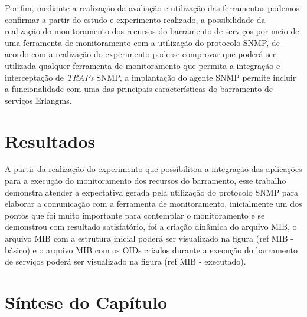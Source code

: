 Por fim, mediante a realização da avaliação e utilização das ferramentas podemos confirmar a partir do estudo e experimento realizado, a possibilidade da realização do monitoramento dos recursos do barramento de serviços por meio de uma ferramenta de monitoramento com a utilização do protocolo \acrshort{SNMP}, de acordo com a realização do experimento pode-se comprovar que poderá ser utilizada qualquer ferramenta de monitoramento que permita a integração e interceptação de \textit{TRAPs} \acrshort{SNMP}, a implantação do agente \acrshort{SNMP} permite incluir a funcionalidade com uma das principais características do barramento de serviços Erlangms.   



\section{Resultados}
\label{resultados}

A partir da realização do experimento que possibilitou a integração das aplicações para a execução do monitoramento dos recursos do barramento, esse trabalho demonstra atender a expectativa gerada pela utilização do protocolo \acrshort{SNMP} para elaborar a comunicação com a ferramenta de monitoramento, inicialmente um dos pontos que foi muito importante para contemplar o monitoramento e se demonstrou com resultado satisfatório, foi a criação dinâmica do arquivo MIB, o arquivo MIB com a estrutura inicial poderá ser visualizado na figura (ref MIB - básico) e o arquivo MIB com os \acrshort{OID}s criados durante a execução do barramento de serviços poderá ser visualizado na figura (ref MIB - executado).
 


\section{Síntese do Capítulo}
\label{sintese5}
